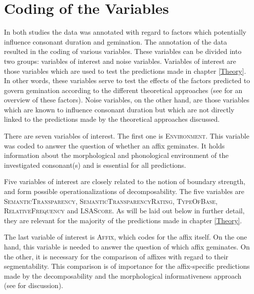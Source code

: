 \section{Coding of the Variables} \label{General method annotation}



In both studies the data was annotated with regard to factors which potentially influence consonant duration and gemination. The annotation of the data resulted in the coding of various variables.
 These variables can be divided into two groups: variables of interest and noise variables. Variables of interest are those variables which are used to test the predictions made in chapter \ref{Theory}. In other words, these variables serve to test the effects of the factors predicted to govern gemination according to the different theoretical approaches (see  for an overview of these factors).
Noise variables, on the other hand, are those variables which are known to influence consonant duration but which are not directly linked to the predictions made by the theoretical approaches discussed.

There are seven variables of interest. The first one is \textsc{Environment}. This variable was coded to answer the question of whether an affix geminates. It holds information about the morphological and phonological environment of the investigated consonant(s) and is essential for all predictions.


Five variables of interest are closely related to the notion of boundary strength,  and form possible operationalizations of decomposability. The five variables are \textsc{SemanticTransparency}, \textsc{SemanticTransparencyRating}, \textsc{TypeOfBase}, \textsc{RelativeFrequency} and \textsc{LSAScore}. As will be laid out below in further detail, they are relevant for the majority of the predictions made in chapter \ref{Theory}. 


The last variable of interest is \textsc{Affix}, which codes for the affix itself. On the one hand, this variable is needed to answer the question of which affix geminates. On the other, it is necessary for the comparison of affixes with regard to their segmentability. This comparison is of importance for the affix-specific predictions made by the decomposability and the morphological informativeness approach (see  for discussion). 


